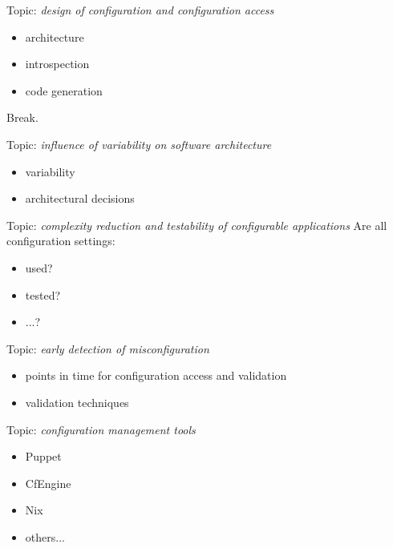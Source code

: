 \documentclass{beamer}
\begin{document}
\begin{frame}
	Topic: \textit{design of configuration and configuration access}
	\begin{itemize}
		\item architecture
		\item introspection
		\item code generation
	\end{itemize}
\end{frame}

\begin{assignment}
	\begin{task}
	Break.
	\end{task}
\end{assignment}

\begin{frame}
	Topic: \textit{influence of variability on software architecture}
	\begin{itemize}
		\item variability
		\item architectural decisions
	\end{itemize}
\end{frame}

\begin{frame}
	Topic: \textit{complexity reduction and testability of configurable applications}
	Are all configuration settings:
	\begin{itemize}
		\item used?
		\item tested?
		\item ...?
	\end{itemize}
\end{frame}

\begin{frame}
	Topic: \textit{early detection of misconfiguration}
	\begin{itemize}
		\item points in time for configuration access and validation
		\item validation techniques
	\end{itemize}
\end{frame}

\begin{frame}
	Topic: \textit{configuration management tools}
	\begin{itemize}
		\item Puppet
		\item CfEngine
		\item Nix
		\item others...
	\end{itemize}
\end{frame}
\end{document}

